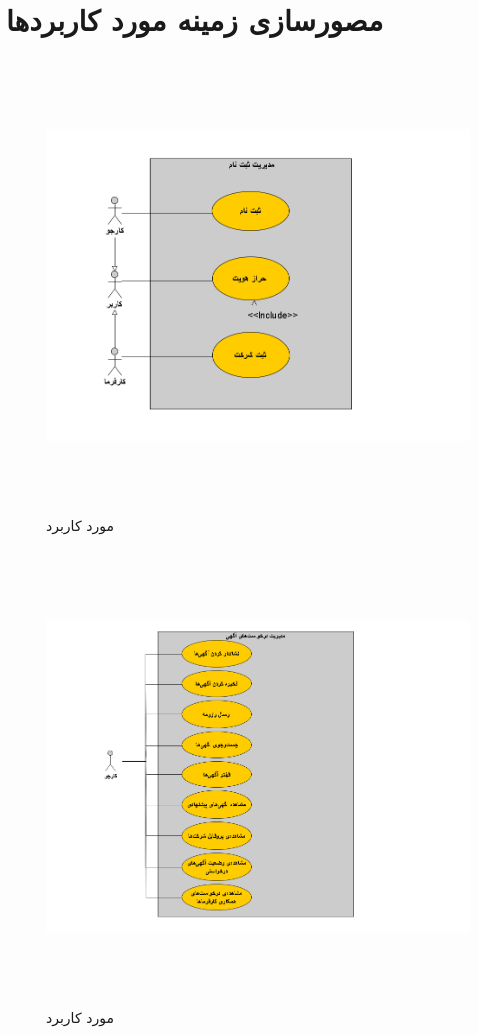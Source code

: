 \section{مصورسازی زمینه‌ مورد کاربرد‌ها}	

\begin{figure}[H]
	\caption{مورد کاربرد }
	\begin{center}
		\includegraphics[width=\textwidth, height=12cm]{./images/1}
	\end{center}
\end{figure}

\begin{figure}[H]
	\caption{مورد کاربرد }
	\begin{center}
		\includegraphics[width=\textwidth, height=12cm]{./images/2}
	\end{center}
\end{figure}

